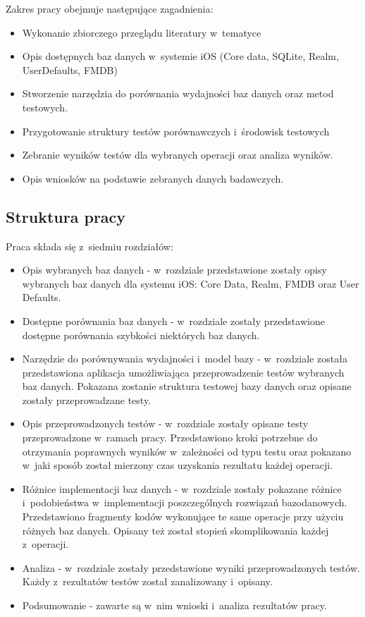 Zakres pracy obejmuje następujące zagadnienia: 

\begin{itemize}
	\item Wykonanie zbiorczego przeglądu literatury w~tematyce
	\item Opis dostępnych baz danych w~systemie iOS (Core data, SQLite, Realm, UserDefaults, FMDB)
	\item Stworzenie narzędzia do porównania wydajności baz danych oraz metod testowych.
	\item Przygotowanie struktury testów porównawczych i~środowisk testowych
	\item Zebranie wyników testów dla wybranych operacji oraz analiza wyników.
	\item Opis wniosków na podstawie zebranych danych badawczych.
\end{itemize}

\subsection{Struktura pracy}

Praca składa się z~siedmiu rozdziałów:

\begin{itemize}
	\item  Opis wybranych baz danych - w~rozdziale przedstawione zostały opisy wybranych baz danych dla systemu iOS: Core Data, Realm, FMDB oraz User Defaults. 
	\item Dostępne porównania baz danych - w~rozdziale zostały przedstawione dostępne porównania szybkości niektórych baz danych.
	\item Narzędzie do porównywania wydajności i~model bazy - w~rozdziale została przedstawiona aplikacja umożliwiająca przeprowadzenie testów wybranych baz danych. Pokazana zostanie struktura testowej bazy danych oraz opisane zostały przeprowadzane testy.
	\item Opis przeprowadzonych testów - w~rozdziale zostały opisane testy przeprowadzone w~ramach pracy. Przedstawiono kroki potrzebne do otrzymania poprawnych wyników w~zależności od typu testu oraz pokazano w~jaki sposób został mierzony czas uzyskania rezultatu każdej operacji. 
		\item Różnice implementacji baz danych -
 w~rozdziale zostały pokazane różnice i~podobieństwa w~implementacji poszczególnych rozwiązań bazodanowych. Przedstawiono fragmenty kodów wykonujące te same operacje przy użyciu różnych baz danych. Opisany też został stopień skomplikowania każdej z~operacji.
	\item Analiza - w~rozdziale zostały przedstawione wyniki przeprowadzonych testów. Każdy z~rezultatów testów został zanalizowany i~opisany.
\item Podsumowanie - zawarte są w~nim wnioski i~analiza rezultatów pracy.
\end{itemize}

